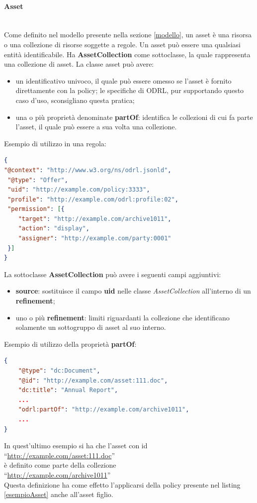\documentclass[12pt,a4paper,twoside]{book}
\begin{document}
\paragraph{Asset}\mbox{}\\
Come definito nel modello presente nella sezione \ref{modello}, un asset è una risorsa o una collezione di risorse soggette a regole. Un asset può essere una qualsiasi entità identificabile. Ha \textbf{AssetCollection} come sottoclasse, la quale rappresenta una collezione di asset. La classe asset può avere:
\begin{itemize}
\item un identificativo univoco, il quale può essere omesso se l'asset è fornito direttamente con la policy; le specifiche di ODRL, pur supportando questo caso d'uso, sconsigliano questa pratica;
\item una o più proprietà denominate \textbf{partOf}: identifica le collezioni di cui fa parte l'asset, il quale può essere a sua volta una collezione.
\end{itemize}
Esempio di utilizzo in una regola:
\begin{lstlisting}[language=json,firstnumber=1,caption={Utilizzo di asset nella proprietà \textbf{target} di una regola},captionpos=b,label=esempioAsset]
{
"@context": "http://www.w3.org/ns/odrl.jsonld",
 "@type": "Offer",
 "uid": "http://example.com/policy:3333",
 "profile": "http://example.com/odrl:profile:02",
 "permission": [{
	"target": "http://example.com/archive1011",
	"action": "display",
	"assigner": "http://example.com/party:0001"
 }]
}
\end{lstlisting}
La sottoclasse \textbf{AssetCollection} può avere i seguenti campi aggiuntivi:
\begin{itemize}
	\item \textbf{source}: sostituisce il campo \textbf{uid} nelle classe \textit{AssetCollection} all'interno di un \textbf{refinement};
	\item uno o più \textbf{refinement}: limiti riguardanti la collezione che identificano solamente un sottogruppo di asset al suo interno.
\end{itemize}
\newpage
Esempio di utilizzo della proprietà \textbf{partOf}:
\begin{lstlisting}[language=json,firstnumber=1,caption={L'asset definito è parte del target presente nel listing \ref{esempioAsset}},captionpos=b,label=esempioAssetColl]
{
	"@type": "dc:Document",
	"@id": "http://example.com/asset:111.doc",
	"dc:title": "Annual Report",
	...
	"odrl:partOf": "http://example.com/archive1011",
	...
}
\end{lstlisting}
In quest'ultimo esempio si ha che l'asset con id \\``\url{http://example.com/asset:111.doc}''\\è definito come parte della collezione\\``\url{http://example.com/archive1011}''\\Questa definizione ha come effetto l'applicarsi della policy presente nel listing \ref{esempioAsset} anche all'asset figlio.
\end{document}

